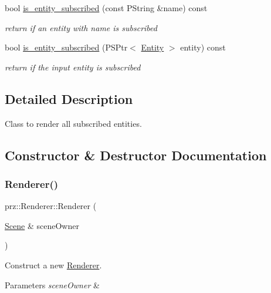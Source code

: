 \begin{DoxyCompactItemize}
bool \mbox{\hyperlink{classprz_1_1_renderer_ae2cc6d2d4a5668f2ef91bc2d994fa9d3}{is\+\_\+entity\+\_\+subscribed}} (const P\+String \&name) const
\begin{DoxyCompactList}\small\item\em return if an entity with name is subscribed \end{DoxyCompactList}\item 
bool \mbox{\hyperlink{classprz_1_1_renderer_a669ce404b1d420c1ebd6ed66925b3289}{is\+\_\+entity\+\_\+subscribed}} (P\+S\+Ptr$<$ \mbox{\hyperlink{classprz_1_1_entity}{Entity}} $>$ entity) const
\begin{DoxyCompactList}\small\item\em return if the input entity is subscribed \end{DoxyCompactList}\end{DoxyCompactItemize}


\subsection{Detailed Description}
Class to render all subscribed entities. 



\subsection{Constructor \& Destructor Documentation}
\mbox{\label{classprz_1_1_renderer_ac65609621c2c993fd923a74d5c9f6042}} 
\subsubsection{\texorpdfstring{Renderer()}{Renderer()}}
{\footnotesize\ttfamily prz\+::\+Renderer\+::\+Renderer (\begin{DoxyParamCaption}\item[{\mbox{\hyperlink{classprz_1_1_scene}{Scene}} \&}]{scene\+Owner }\end{DoxyParamCaption})\hspace{0.3cm}{\ttfamily [inline]}}



Construct a new \mbox{\hyperlink{classprz_1_1_renderer}{Renderer}}. 


\begin{DoxyParams}{Parameters}
{\em scene\+Owner} & \\
\hline
\end{DoxyParams}
\mbox{\label{classprz_1_1_renderer_aa4a2a69d65e8c6f30c4fcf693c006f08}} 
